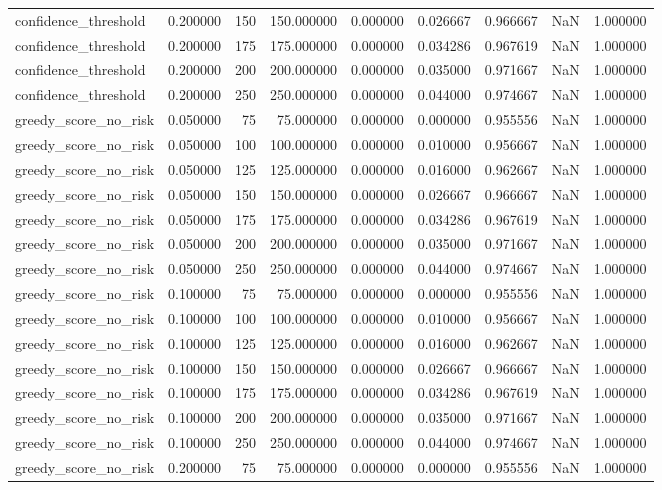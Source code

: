 \begin{tabular}{lrrrrrrrr}
confidence_threshold & 0.200000 & 150 & 150.000000 & 0.000000 & 0.026667 & 0.966667 & NaN & 1.000000 \\
confidence_threshold & 0.200000 & 175 & 175.000000 & 0.000000 & 0.034286 & 0.967619 & NaN & 1.000000 \\
confidence_threshold & 0.200000 & 200 & 200.000000 & 0.000000 & 0.035000 & 0.971667 & NaN & 1.000000 \\
confidence_threshold & 0.200000 & 250 & 250.000000 & 0.000000 & 0.044000 & 0.974667 & NaN & 1.000000 \\
greedy_score_no_risk & 0.050000 & 75 & 75.000000 & 0.000000 & 0.000000 & 0.955556 & NaN & 1.000000 \\
greedy_score_no_risk & 0.050000 & 100 & 100.000000 & 0.000000 & 0.010000 & 0.956667 & NaN & 1.000000 \\
greedy_score_no_risk & 0.050000 & 125 & 125.000000 & 0.000000 & 0.016000 & 0.962667 & NaN & 1.000000 \\
greedy_score_no_risk & 0.050000 & 150 & 150.000000 & 0.000000 & 0.026667 & 0.966667 & NaN & 1.000000 \\
greedy_score_no_risk & 0.050000 & 175 & 175.000000 & 0.000000 & 0.034286 & 0.967619 & NaN & 1.000000 \\
greedy_score_no_risk & 0.050000 & 200 & 200.000000 & 0.000000 & 0.035000 & 0.971667 & NaN & 1.000000 \\
greedy_score_no_risk & 0.050000 & 250 & 250.000000 & 0.000000 & 0.044000 & 0.974667 & NaN & 1.000000 \\
greedy_score_no_risk & 0.100000 & 75 & 75.000000 & 0.000000 & 0.000000 & 0.955556 & NaN & 1.000000 \\
greedy_score_no_risk & 0.100000 & 100 & 100.000000 & 0.000000 & 0.010000 & 0.956667 & NaN & 1.000000 \\
greedy_score_no_risk & 0.100000 & 125 & 125.000000 & 0.000000 & 0.016000 & 0.962667 & NaN & 1.000000 \\
greedy_score_no_risk & 0.100000 & 150 & 150.000000 & 0.000000 & 0.026667 & 0.966667 & NaN & 1.000000 \\
greedy_score_no_risk & 0.100000 & 175 & 175.000000 & 0.000000 & 0.034286 & 0.967619 & NaN & 1.000000 \\
greedy_score_no_risk & 0.100000 & 200 & 200.000000 & 0.000000 & 0.035000 & 0.971667 & NaN & 1.000000 \\
greedy_score_no_risk & 0.100000 & 250 & 250.000000 & 0.000000 & 0.044000 & 0.974667 & NaN & 1.000000 \\
greedy_score_no_risk & 0.200000 & 75 & 75.000000 & 0.000000 & 0.000000 & 0.955556 & NaN & 1.000000 \\

\end{tabular}
